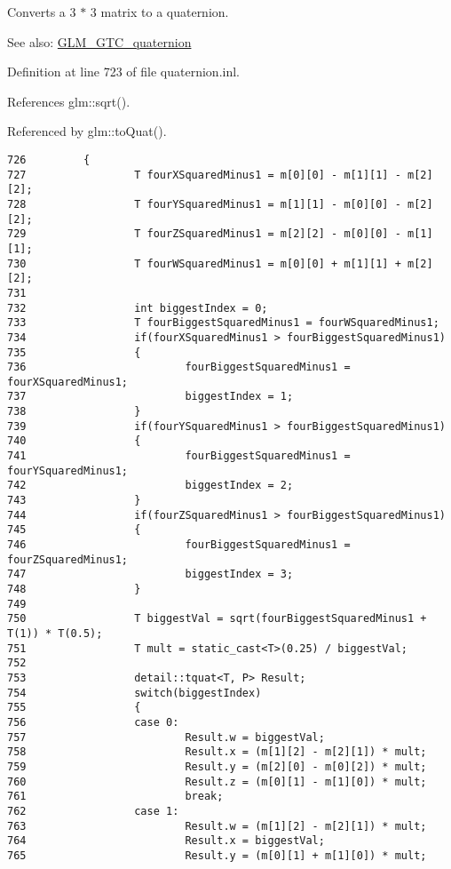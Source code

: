 Converts a 3 $\ast$ 3 matrix to a quaternion.

\begin{Desc}
\item[See also:]\hyperlink{group__gtc__quaternion}{GLM\_\-GTC\_\-quaternion} \end{Desc}


Definition at line 723 of file quaternion.inl.

References glm::sqrt().

Referenced by glm::toQuat().

\begin{Code}\begin{verbatim}726         {
727                 T fourXSquaredMinus1 = m[0][0] - m[1][1] - m[2][2];
728                 T fourYSquaredMinus1 = m[1][1] - m[0][0] - m[2][2];
729                 T fourZSquaredMinus1 = m[2][2] - m[0][0] - m[1][1];
730                 T fourWSquaredMinus1 = m[0][0] + m[1][1] + m[2][2];
731 
732                 int biggestIndex = 0;
733                 T fourBiggestSquaredMinus1 = fourWSquaredMinus1;
734                 if(fourXSquaredMinus1 > fourBiggestSquaredMinus1)
735                 {
736                         fourBiggestSquaredMinus1 = fourXSquaredMinus1;
737                         biggestIndex = 1;
738                 }
739                 if(fourYSquaredMinus1 > fourBiggestSquaredMinus1)
740                 {
741                         fourBiggestSquaredMinus1 = fourYSquaredMinus1;
742                         biggestIndex = 2;
743                 }
744                 if(fourZSquaredMinus1 > fourBiggestSquaredMinus1)
745                 {
746                         fourBiggestSquaredMinus1 = fourZSquaredMinus1;
747                         biggestIndex = 3;
748                 }
749 
750                 T biggestVal = sqrt(fourBiggestSquaredMinus1 + T(1)) * T(0.5);
751                 T mult = static_cast<T>(0.25) / biggestVal;
752 
753                 detail::tquat<T, P> Result;
754                 switch(biggestIndex)
755                 {
756                 case 0:
757                         Result.w = biggestVal;
758                         Result.x = (m[1][2] - m[2][1]) * mult;
759                         Result.y = (m[2][0] - m[0][2]) * mult;
760                         Result.z = (m[0][1] - m[1][0]) * mult;
761                         break;
762                 case 1:
763                         Result.w = (m[1][2] - m[2][1]) * mult;
764                         Result.x = biggestVal;
765                         Result.y = (m[0][1] + m[1][0]) * mult;

\end{verbatim}
\end{Code}
